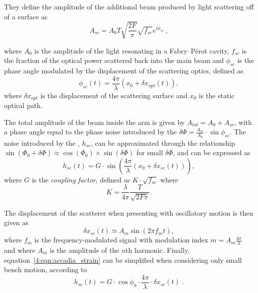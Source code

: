 They define the amplitude of the additional beam produced by light scattering off of a surface as
%
\begin{equation}
    A_{sc} = A_{0} T \sqrt{\frac{2 F}{\pi}} \sqrt{f_{sc}} e^{i \phi_{sc}}\,,
    \label{4:eqn:accadia_amplitude}
\end{equation}

%
where $A_{0}$ is the amplitude of the light resonating in a Fabry–Pérot cavity, $f_{sc}$ is the fraction of the optical power scattered back into the main beam and $\phi_{sc}$ is the phase angle modulated by the displacement of the scattering optics, defined as
%
\begin{equation}
    \phi_{sc}(t) = \frac{4 \pi}{\lambda} ( x_{0} + \delta x_{opt}(t) ),
    \label{4:eqn:accadia_phase_noise}
\end{equation}
%
where $\delta x_{opt}$ is the displacement of the scattering surface and $x_0$ is the static optical path.

The total amplitude of the beam inside the arm is given by $A_{tot} = A_{0} + A_{sc}$, with a phase angle equal to the phase noise introduced by the \scl{} $\delta \Phi = \frac{A_{sc}}{A_{0}} \cdot \sin \phi_{sc}$. The noise introduced by the \scl{}, $h_{sc}$, can be approximated through the relationship $\sin(\Phi_0+ \delta\Phi) \approx \cos(\Phi_0) \times \sin(\delta \Phi)$ for small $\delta\Phi$, and can be expressed as
%
\begin{equation}
    h_{sc}(t) = G \cdot \sin \left(\frac{4 \pi}{\lambda} (x_{0} + \delta x_{sc}(t) ) \right),
    \label{4:eqn:accadia_strain}
\end{equation}
%
where $G$ is the \emph{coupling factor}, defined as $K \cdot \sqrt{f_{sc}}$ where
%
\begin{equation}
K = \frac{\lambda}{4 \pi} \frac{T}{\sqrt{2 F \pi}}.
\end{equation}
%

The displacement of the scatterer when presenting with oscillatory motion is then given as
%
\begin{equation}
    \delta x_{sc} (t) \simeq A_{m} \sin(2 \pi f_{m} t),
    \label{4:eqn:accadia_oscillatory}
\end{equation}
%
where $f_{m}$ is the frequency-modulated signal with modulation index $m = A_{m} \frac{4 \pi}{\lambda}$ and where $A_{m}$ is the amplitude of the $n$th harmonic. Finally, equation~\ref{4:eqn:accadia_strain} can be simplified when considering only small bench motion, according to
%
\begin{equation}
    h_{sc}(t) = G \cdot \cos\phi_{0} \cdot \frac{4 \pi}{\lambda} \cdot \delta x_{sc}(t) \;.
    \label{4:eqn:accadia_strain_linearized}
\end{equation}

